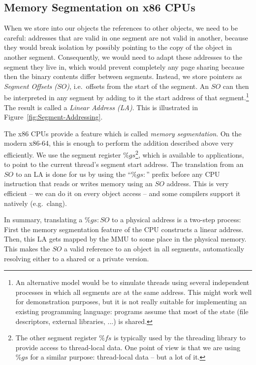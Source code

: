 \documentclass{sigplanconf}
\begin{document}
\subsection{Memory Segmentation on x86 CPUs}

When we store into our objects the references to other objects, we
need to be careful: addresses that are valid in one segment are not
valid in another, because they would break isolation by possibly pointing to
the copy of the object in another segment.  Consequently, we would
need to adapt these addresses to the segment they live in, which would
prevent completely any page sharing because then the binary contents
differ between segments.  Instead, we store pointers as
\emph{Segment Offsets ($SO$)}, i.e.\ offsets from the start of the
segment.  An $SO$ can then be interpreted in any segment by adding to
it the start address of that segment.\footnote{An alternative model
would be to simulate threads using several independent processes in
which all segments are at the same address.  This might work well for
demonstration purposes, but it is not really suitable for implementing
an existing programming language: programs assume that most of the
state (file descriptors, external libraries, ...) is shared.} The
result is called a \emph{Linear Address (LA)}. This is illustrated in
Figure~\ref{fig:Segment-Addressing}.

The x86 CPUs provide a feature which is called \emph{memory
segmentation}.  On the modern x86-64, this is enough to perform the
addition described above very efficiently.  We use the segment
register $\%gs$\footnote{The other segment register $\%fs$ is
typically used by the threading library to provide access to
thread-local data.  One point of view is that we are using $\%gs$ for
a similar purpose: thread-local data -- but a lot of it.}, which is
available to applications, to point to the current thread's segment
start address.  The translation from an $SO$ to an LA is done for us by
using the ``$\%gs\colon$'' prefix before any CPU instruction that
reads or writes memory using an $SO$ address.  This is very efficient
-- we can do it on every object access -- and some compilers support it
natively (e.g.\ clang).

In summary, translating a $\%gs:SO$ to a physical address is a
two-step process: First the memory segmentation feature of the CPU
constructs a linear address. Then, this LA gets mapped by the MMU to
some place in the physical memory. This makes the $SO$ a valid reference
to an object in all segments, automatically resolving either to a
shared or a private version.
\end{document}
